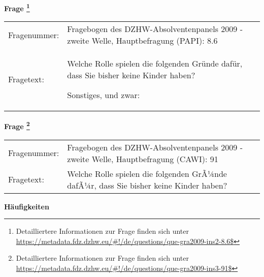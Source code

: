 				\vspace*{0.5cm}
                \noindent\textbf{Frage
	                \footnote{Detailliertere Informationen zur Frage finden sich unter
		              \url{https://metadata.fdz.dzhw.eu/\#!/de/questions/que-gra2009-ins2-8.6$}}}\\
				\begin{tabularx}{\hsize}{@{}lX}
					Fragenummer: &
					  Fragebogen des DZHW-Absolventenpanels 2009 - zweite Welle, Hauptbefragung (PAPI):
					  8.6
 \\
					Fragetext: & Welche Rolle spielen die folgenden Gründe dafür, dass Sie bisher keine Kinder haben?\par  Sonstiges, und zwar: \\
				\end{tabularx}
				\vspace*{0.5cm}
                \noindent\textbf{Frage
	                \footnote{Detailliertere Informationen zur Frage finden sich unter
		              \url{https://metadata.fdz.dzhw.eu/\#!/de/questions/que-gra2009-ins3-91$}}}\\
				\begin{tabularx}{\hsize}{@{}lX}
					Fragenummer: &
					  Fragebogen des DZHW-Absolventenpanels 2009 - zweite Welle, Hauptbefragung (CAWI):
					  91
 \\
					Fragetext: & Welche Rolle spielen die folgenden GrÃ¼nde dafÃ¼r, dass Sie bisher keine Kinder haben? \\
				\end{tabularx}





        		\vspace*{0.5cm}
                \noindent\textbf{Häufigkeiten}

